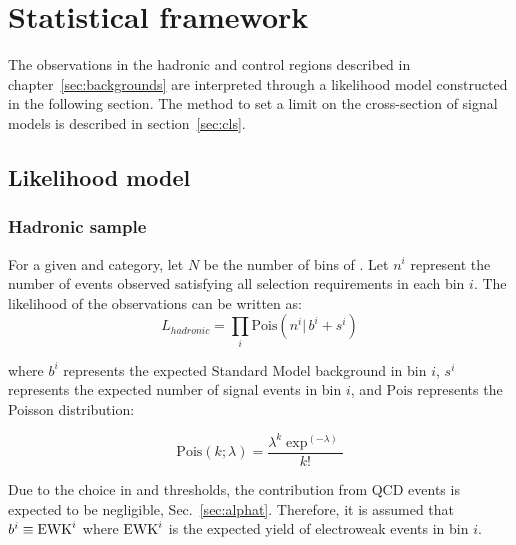 \clearpage
\section{Statistical framework}
\label{sec:statistics}
The observations in the hadronic and control regions described in 
chapter~\ref{sec:backgrounds} are interpreted through a likelihood model 
constructed in the following section. The method to set a limit on the 
cross-section of signal models is described in section~\ref{sec:cls}. 

\subsection{Likelihood model\label{likelihood}}

\subsubsection{Hadronic sample}
\label{sec:hadronicLikelihood}

For a given \njet and \nb category, 
let $N$ be the number of bins of \HT. Let $n^i$ represent 
the number of events observed satisfying all selection requirements 
in each \HT bin $i$.  The likelihood of the observations can be written
as:
\begin{equation}
L_{hadronic}=\prod_i \mathrm{Pois}(n^i |\, b^i + s^i)
\label{eq:hadronicLikelihood}
\end{equation}

where $b^i$ represents the expected Standard Model background in bin
$i$, $s^i$ represents the expected number of signal events in bin $i$,
and $\mathrm{Pois}$ represents the Poisson distribution:

\begin{equation}
\mathrm{Pois}\left(k;\lambda\right)= \frac{\lambda^k \exp^{\left(-\lambda\right)}}{k!}
\label{eq:poisson}
\end{equation}

Due to the choice in \alphat and \scalht thresholds, the contribution 
from QCD events is expected to be negligible, Sec.~\ref{sec:alphat}. Therefore,
it is assumed that $b^i\equiv \mathrm{EWK}^i$ where $\mathrm{EWK}^i$ is the expected 
yield of electroweak events in bin $i$.


